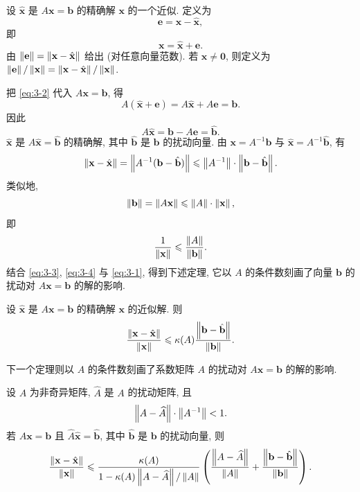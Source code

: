 设 $\hat{\mathbf{x}}$ 是 $A\mathbf{x}=\mathbf{b}$ 的精确解 $\mathbf{x}$ 的一个近似. 定义为
\[
  \mathbf{e}=\mathbf{x}-\hat{\mathbf{x}},
\]
即
\begin{equation}
  \mathbf{x}=\hat{\mathbf{x}}+\mathbf{e}.
  \label{eq:3-2}
\end{equation}
由 $\left\|\mathbf{e}\right\|=\left\|\mathbf{x}-\hat{\mathbf{x}}\right\|$ 给出 (对任意向量范数). 若 $\mathbf{x}\neq\mathbf{0}$, 则定义为
$\left\|\mathbf{e}\right\|/\left\|\mathbf{x}\right\|=\left\|\mathbf{x}-\hat{\mathbf{x}}\right\|/\left\|\mathbf{x}\right\|$.

把 \eqref{eq:3-2} 代入 $A\mathbf{x}=\mathbf{b}$, 得
\[
  A(\hat{\mathbf{x}}+\mathbf{e})=A\hat{\mathbf{x}}+A\mathbf{e}=\mathbf{b}.
\]
因此
\[
  A\hat{\mathbf{x}}=\mathbf{b}-A\mathbf{e}=\hat{\mathbf{b}}.
\]
$\hat{\mathbf{x}}$ 是 $A\hat{\mathbf{x}}=\hat{\mathbf{b}}$ 的精确解, 其中 $\hat{\mathbf{b}}$ 是 $\mathbf{b}$ 的扰动向量. 由 $\mathbf{x}=A^{-1}\mathbf{b}$ 与 $\hat{\mathbf{x}}=A^{-1}\hat{\mathbf{b}}$, 有
\begin{equation}
  \left\|\mathbf{x}-\hat{\mathbf{x}}\right\|=\left\|A^{-1}(\mathbf{b}-\hat{\mathbf{b}})\right\|
  \leqslant\left\|A^{-1}\right\|\cdot\left\|\mathbf{b}-\hat{\mathbf{b}}\right\|.
  \label{eq:3-3}
\end{equation}
类似地,
\[
  \left\|\mathbf{b}\right\|=\left\|A\mathbf{x}\right\|\leqslant\left\|A\right\|\cdot\left\|\mathbf{x}\right\|,
\]
即
\begin{equation}
  \frac{1}{\left\|\mathbf{x}\right\|}\leqslant\frac{\left\|A\right\|}{\left\|\mathbf{b}\right\|}.
  \label{eq:3-4}
\end{equation}
结合 \eqref{eq:3-3}, \eqref{eq:3-4} 与 \eqref{eq:3-1}, 得到下述定理, 它以 $A$ 的条件数刻画了向量 $\mathbf{b}$ 的扰动对 $A\mathbf{x}=\mathbf{b}$ 的解的影响.

\begin{theorem}
\label{thm:3-7}
设 $\hat{\mathbf{x}}$ 是 $A\mathbf{x}=\mathbf{b}$ 的精确解 $\mathbf{x}$ 的近似解. 则
\[
  \frac{\left\|\mathbf{x}-\hat{\mathbf{x}}\right\|}{\left\|\mathbf{x}\right\|}
  \leqslant\kappa(A)\frac{\left\|\mathbf{b}-\hat{\mathbf{b}}\right\|}{\left\|\mathbf{b}\right\|}.
\]
\end{theorem}

下一个定理则以 $A$ 的条件数刻画了系数矩阵 $A$ 的扰动对 $A\mathbf{x}=\mathbf{b}$ 的解的影响.

\begin{theorem}
\label{thm:3-8}
设 $A$ 为非奇异矩阵, $\widehat{A}$ 是 $A$ 的扰动矩阵, 且
\[
  \left\|A-\widehat{A}\right\|\cdot\left\|A^{-1}\right\|<1.
\]
若 $A\mathbf{x}=\mathbf{b}$ 且 $\widehat{A}\hat{\mathbf{x}}=\hat{\mathbf{b}}$, 其中 $\hat{\mathbf{b}}$ 是 $\mathbf{b}$ 的扰动向量, 则
\[
  \frac{\left\|\mathbf{x}-\hat{\mathbf{x}}\right\|}{\left\|\mathbf{x}\right\|}
  \leqslant\frac{\kappa(A)}{1-\kappa(A)\left\|A-\widehat{A}\right\|/\left\|A\right\|}
  \left(\frac{\left\|A-\widehat{A}\right\|}{\left\|A\right\|}+\frac{\left\|\mathbf{b}-\hat{\mathbf{b}}\right\|}{\left\|\mathbf{b}\right\|}\right).
\]
\end{theorem}

